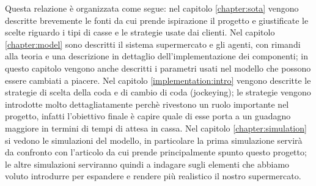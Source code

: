 Questa relazione è organizzata come segue: nel capitolo \ref{chapter:sota} vengono descritte brevemente le fonti da cui prende ispirazione il progetto e giustificate le scelte riguardo i tipi di casse e le strategie usate dai clienti. Nel capitolo \ref{chapter:model} sono descritti il sistema supermercato e gli agenti, con rimandi alla teoria e una descrizione in dettaglio dell'implementazione dei componenti; in questo capitolo vengono anche descritti i parametri usati nel modello che possono essere cambiati a piacere. Nel capitolo \ref{implementation:intro} vengono descritte le strategie di scelta della coda e di cambio di coda (jockeying); le strategie vengono introdotte molto dettagliatamente perchè rivestono un ruolo importante nel progetto, infatti l'obiettivo finale è capire quale di esse porta a un guadagno maggiore in termini di tempi di attesa in cassa. Nel capitolo \ref{chapter:simulation} si vedono le simulazioni del modello, in particolare la prima simulazione servirà da confronto con l'articolo da cui prende principalmente spunto questo progetto; le altre simulazioni serviranno quindi a indagare sugli elementi che abbiamo voluto introdurre per espandere e rendere più realistico il nostro supermercato.
